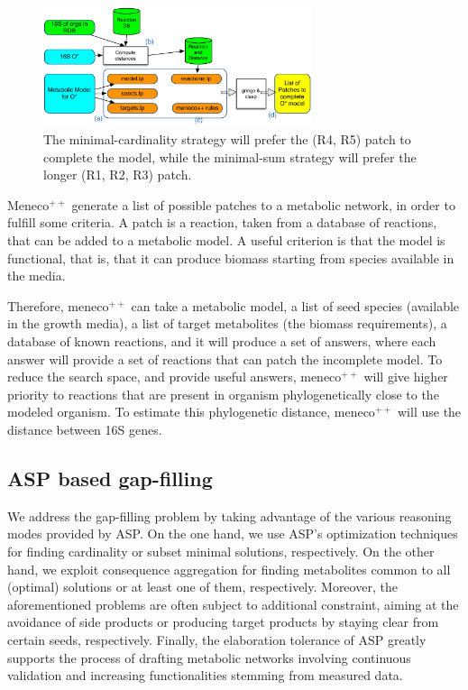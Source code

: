 \documentclass{article}
\newcommand{\Meneco}{Meneco$^{++}$\xspace}
\newcommand{\meneco}{meneco$^{++}$\xspace}
\begin{document}
\begin{figure}[tb]
	\begin{center}
		\includegraphics[width=0.7\textwidth]{figs/overview.pdf}
	\end{center}
	\caption[]{The minimal-cardinality strategy will prefer the (R4, R5) patch to complete the model, while the minimal-sum strategy will prefer the longer (R1, R2, R3) patch.}
	\label{fig:overview}
\end{figure}


\Meneco generate a list of possible patches to a metabolic network, in order to fulfill some criteria.
A patch is a reaction, taken from a database of reactions, that can be added to a metabolic model.
A useful criterion is that the model is functional, that is, that it can produce biomass starting from species available in the media.

Therefore, \meneco can take a metabolic model, a list of seed species (available in the growth media), a list of target metabolites (the biomass requirements), a database of known reactions, and it will produce a set of answers, where each answer will provide a set of reactions that can patch the incomplete model.
To reduce the search space, and provide useful answers, \meneco will give higher priority to reactions that are present in organism phylogenetically close to the modeled organism. To estimate this phylogenetic distance, \meneco will use the distance between 16S genes.


\subsection{ASP based gap-filling}

We address the gap-filling problem by taking advantage of the various reasoning modes provided by ASP. On the one hand, we use ASP’s optimization techniques for finding cardinality or subset minimal solutions, respectively. On the other hand, we exploit consequence aggregation for finding metabolites common to all (optimal) solutions or at least one of them, respectively. Moreover, the aforementioned problems are often subject to additional constraint, aiming at the avoidance of side products or producing target products by staying clear from certain seeds, respectively. Finally, the elaboration tolerance of ASP greatly supports the process of drafting metabolic networks involving continuous validation and increasing functionalities stemming from measured data.
\end{document}
